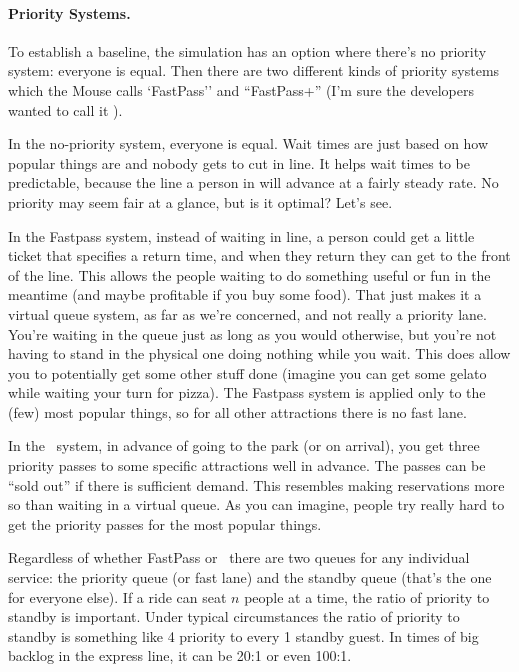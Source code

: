 \documentclass[a4paper]{report}
\begin{document}
\paragraph{Priority Systems.}
To establish a baseline, the simulation has an option where there's no priority system: everyone is equal. Then there are two different kinds of priority systems which the Mouse calls `FastPass'' and ``FastPass+'' (I'm sure the developers wanted to call it \FPP).

In the no-priority system, everyone is equal. Wait times are just based on how popular things are and nobody gets to cut in line. It helps wait times to be predictable, because the line a person in will advance at a fairly steady rate. No priority may seem fair at a glance, but is it optimal? Let's see. 

In the Fastpass system, instead of waiting in line, a person could get a little ticket that specifies a return time, and when they return they can get to the front of the line. This allows the people waiting to do something useful or fun in the meantime (and maybe profitable if you buy some food). That just makes it a virtual queue system, as far as we're concerned, and not really a priority lane. You're waiting in the queue just as long as you would otherwise, but you're not having to stand in the physical one doing nothing while you wait. This does allow you to potentially get some other stuff done (imagine you can get some gelato while waiting your turn for pizza). The Fastpass system is applied only to the (few) most popular things, so for all other attractions there is no fast lane. 

In the \FPP~system, in advance of going to the park (or on arrival), you get three priority passes to some specific attractions well in advance. The passes can be ``sold out'' if there is sufficient demand. This resembles making reservations more so than waiting in a virtual queue. As you can imagine, people try really hard to get the priority passes for the most popular things.

Regardless of whether FastPass or \FPP~there are two queues for any individual service: the priority queue (or fast lane) and the standby queue (that's the one for everyone else). If a ride can seat $n$ people at a time, the ratio of priority to standby is important. Under typical circumstances the ratio of priority to standby is something like 4 priority to every 1 standby guest. In times of big backlog in the express line, it can be 20:1 or even 100:1.
\end{document}
